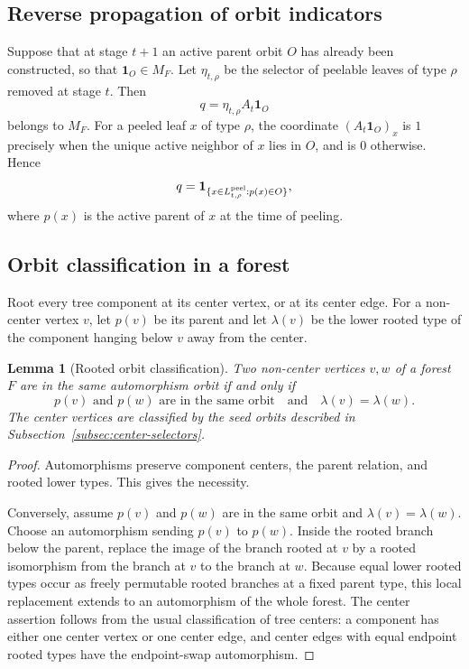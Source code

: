 \documentclass[a4paper,fleqn]{cas-sc}
\newtheorem{lemma}[theorem]{Lemma}
\theoremstyle{definition}
\theoremstyle{remark}
\newcommand{\one}{\mathbf 1}
\begin{document}
\subsection{Reverse propagation of orbit indicators}
\label{subsec:reverse-propagation}

Suppose that at stage \(t+1\) an active parent orbit \(O\) has already been
constructed, so that \(\one_O\in M_F\).  Let \(\eta_{t,\rho}\) be the selector of
peelable leaves of type \(\rho\) removed at stage \(t\).  Then
\[
        q=\eta_{t,\rho}A_t\one_O
\]
belongs to \(M_F\).  For a peeled leaf \(x\) of type \(\rho\), the coordinate
\((A_t\one_O)_x\) is \(1\) precisely when the unique active neighbor of \(x\) lies in
\(O\), and is \(0\) otherwise.  Hence
\[
        q=\one_{\{x\in L_{t,\rho}^{\rm peel}:p(x)\in O\}},
\]
where \(p(x)\) is the active parent of \(x\) at the time of peeling.

\subsection{Orbit classification in a forest}

Root every tree component at its center vertex, or at its center edge.  For a
non-center vertex \(v\), let \(p(v)\) be its parent and let \(\lambda(v)\) be the lower
rooted type of the component hanging below \(v\) away from the center.

\begin{lemma}[Rooted orbit classification]
\label{lem:rooted-orbit-classification}
Two non-center vertices \(v,w\) of a forest \(F\) are in the same automorphism orbit
if and only if
\[
        p(v)\text{ and }p(w)\text{ are in the same orbit}
        \quad\text{and}\quad
        \lambda(v)=\lambda(w).
\]
The center vertices are classified by the seed orbits described in
Subsection~\ref{subsec:center-selectors}.
\end{lemma}

\begin{proof}
Automorphisms preserve component centers, the parent relation, and rooted lower
types.  This gives the necessity.

Conversely, assume \(p(v)\) and \(p(w)\) are in the same orbit and
\(\lambda(v)=\lambda(w)\).  Choose an automorphism sending \(p(v)\) to \(p(w)\).
Inside the rooted branch below the parent, replace the image of the branch rooted
at \(v\) by a rooted isomorphism from the branch at \(v\) to the branch at \(w\).
Because equal lower rooted types occur as freely permutable rooted branches at a
fixed parent type, this local replacement extends to an automorphism of the whole
forest.  The center assertion follows from the usual classification of tree
centers: a component has either one center vertex or one center edge, and center
edges with equal endpoint rooted types have the endpoint-swap automorphism.
\end{proof}
\end{document}
